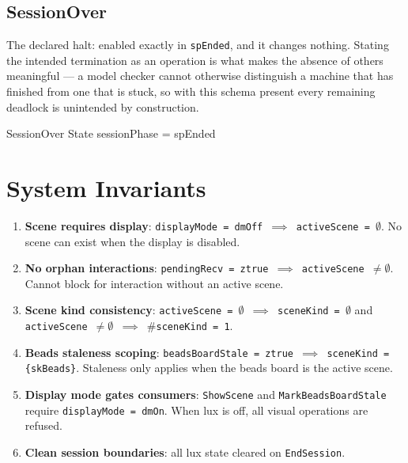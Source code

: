 \documentclass[a4paper,10pt,fleqn]{article}
\begin{document}
\subsection{SessionOver}

The declared halt: enabled exactly in \texttt{spEnded}, and it changes
nothing. Stating the intended termination as an operation is what makes
the absence of others meaningful --- a model checker cannot otherwise
distinguish a machine that has finished from one that is stuck, so with
this schema present every remaining deadlock is unintended by
construction.

\begin{schema}{SessionOver}
  \Xi State
  \where
  sessionPhase = spEnded
\end{schema}


\section{System Invariants}

\begin{enumerate}
  \item \textbf{Scene requires display}: \texttt{displayMode = dmOff
    $\implies$ activeScene = $\emptyset$}. No scene can exist when the
    display is disabled.

  \item \textbf{No orphan interactions}: \texttt{pendingRecv = ztrue
    $\implies$ activeScene $\neq \emptyset$}. Cannot block for
    interaction without an active scene.

  \item \textbf{Scene kind consistency}: \texttt{activeScene = $\emptyset$
    $\implies$ sceneKind = $\emptyset$} and
    \texttt{activeScene $\neq \emptyset$ $\implies$ $\#$sceneKind = 1}.

  \item \textbf{Beads staleness scoping}: \texttt{beadsBoardStale = ztrue
    $\implies$ sceneKind = \{skBeads\}}. Staleness only applies when the
    beads board is the active scene.

  \item \textbf{Display mode gates consumers}: \texttt{ShowScene} and
    \texttt{MarkBeadsBoardStale} require \texttt{displayMode = dmOn}.
    When lux is off, all visual operations are refused.

  \item \textbf{Clean session boundaries}: all lux state cleared on
    \texttt{EndSession}.
\end{enumerate}
\end{document}
